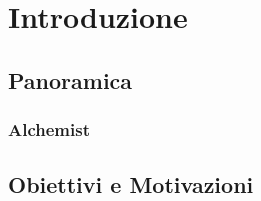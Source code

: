 \chapter{Introduzione}\label{chap:introduction}

\section{Panoramica}\label{sec:background}
\subsection{Alchemist}\label{ssec:alchemist}
\section{Obiettivi e Motivazioni}\label{sec:objectives}


